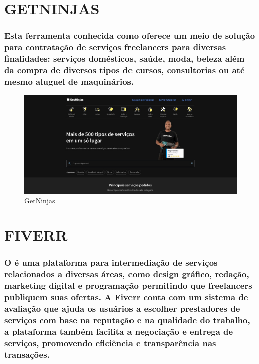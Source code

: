 \section{GETNINJAS}
\subsubsection{Esta ferramenta conhecida como \cite{GetNinjas} oferece um meio de solução para contratação de serviços freelancers para diversas finalidades: serviços domésticos, saúde, moda, beleza além da compra de diversos tipos de cursos, consultorias ou até mesmo aluguel de maquinários.}

\begin{figure}[h!]
\centering
\caption{GetNinjas}
\label{fig:GetNinjas}
\includegraphics[scale=0.4]{Illustrations/GetNinjas.jpg}
\end{figure}

\section{FIVERR}
\subsubsection{O \cite{Fiverr} é uma plataforma para intermediação de serviços relacionados a diversas áreas, como design gráfico, redação, marketing digital e programação permitindo que freelancers publiquem suas ofertas. A Fiverr conta com um sistema de avaliação que ajuda os usuários a escolher prestadores de serviços com base na reputação e na qualidade do trabalho, a plataforma também facilita a negociação e entrega de serviços, promovendo eficiência e transparência nas transações.}

\clearpage

